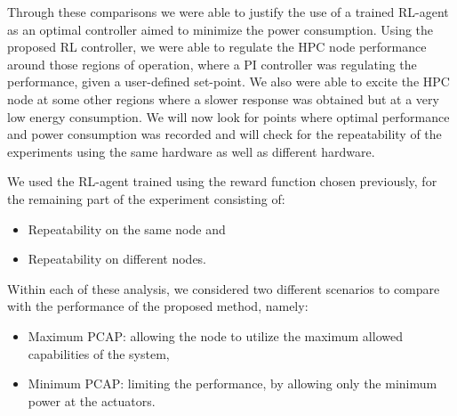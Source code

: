 Through these comparisons we were able to justify the use of a trained RL-agent as an optimal controller aimed to minimize the power consumption. Using the proposed RL controller, we were able to regulate the HPC node performance around those regions of operation, where a PI controller was regulating the performance, given a user-defined set-point. We also were able to excite the HPC node at some other regions where a slower response was obtained but at a very low energy consumption. We will now look for points where optimal performance and power consumption was recorded and will check for the repeatability of the experiments using the same hardware as well as different hardware.

We used the RL-agent trained using the reward function chosen previously, for the remaining part of the experiment consisting of:
\begin{itemize}
\item Repeatability on the same node and
\item Repeatability on different nodes.
\end{itemize}

Within each of these analysis, we considered two different scenarios to compare with the performance of the proposed method, namely:
\begin{itemize}
\item Maximum PCAP: allowing the node to utilize the maximum allowed capabilities of the system,
\item Minimum PCAP: limiting the performance, by allowing only the minimum power at the actuators.
\end{itemize}




